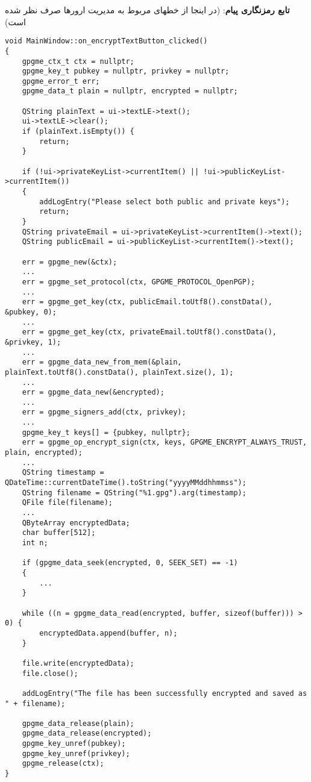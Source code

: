 \documentclass{report}
\begin{document}
\textbf{تابع رمزنگاری پیام}:
(در اینجا از خطهای مربوط به مدیریت ارورها صرف نظر شده است)
\begin{LTR}
    \begin{verbatim}
void MainWindow::on_encryptTextButton_clicked()
{
    gpgme_ctx_t ctx = nullptr;
    gpgme_key_t pubkey = nullptr, privkey = nullptr;
    gpgme_error_t err;
    gpgme_data_t plain = nullptr, encrypted = nullptr;
    
    QString plainText = ui->textLE->text();
    ui->textLE->clear();
    if (plainText.isEmpty()) {
        return;
    }
    
    if (!ui->privateKeyList->currentItem() || !ui->publicKeyList->currentItem())
    {
        addLogEntry("Please select both public and private keys");
        return;
    }
    QString privateEmail = ui->privateKeyList->currentItem()->text();
    QString publicEmail = ui->publicKeyList->currentItem()->text();
    
    err = gpgme_new(&ctx);
    ...
    err = gpgme_set_protocol(ctx, GPGME_PROTOCOL_OpenPGP);
    ...
    err = gpgme_get_key(ctx, publicEmail.toUtf8().constData(), &pubkey, 0);
    ...
    err = gpgme_get_key(ctx, privateEmail.toUtf8().constData(), &privkey, 1);
    ...
    err = gpgme_data_new_from_mem(&plain, plainText.toUtf8().constData(), plainText.size(), 1);
    ...
    err = gpgme_data_new(&encrypted);
    ...
    err = gpgme_signers_add(ctx, privkey);
    ...
    gpgme_key_t keys[] = {pubkey, nullptr};
    err = gpgme_op_encrypt_sign(ctx, keys, GPGME_ENCRYPT_ALWAYS_TRUST, plain, encrypted);
    ...
    QString timestamp = QDateTime::currentDateTime().toString("yyyyMMddhhmmss");
    QString filename = QString("%1.gpg").arg(timestamp);
    QFile file(filename);
    ...
    QByteArray encryptedData;
    char buffer[512];
    int n;

    if (gpgme_data_seek(encrypted, 0, SEEK_SET) == -1)
    {
        ...
    }
    
    while ((n = gpgme_data_read(encrypted, buffer, sizeof(buffer))) > 0) {
        encryptedData.append(buffer, n);
    }
    
    file.write(encryptedData);
    file.close();
    
    addLogEntry("The file has been successfully encrypted and saved as " + filename);
    
    gpgme_data_release(plain);
    gpgme_data_release(encrypted);
    gpgme_key_unref(pubkey);
    gpgme_key_unref(privkey);
    gpgme_release(ctx);
}
    \end{verbatim}
\end{LTR}
\end{document}

